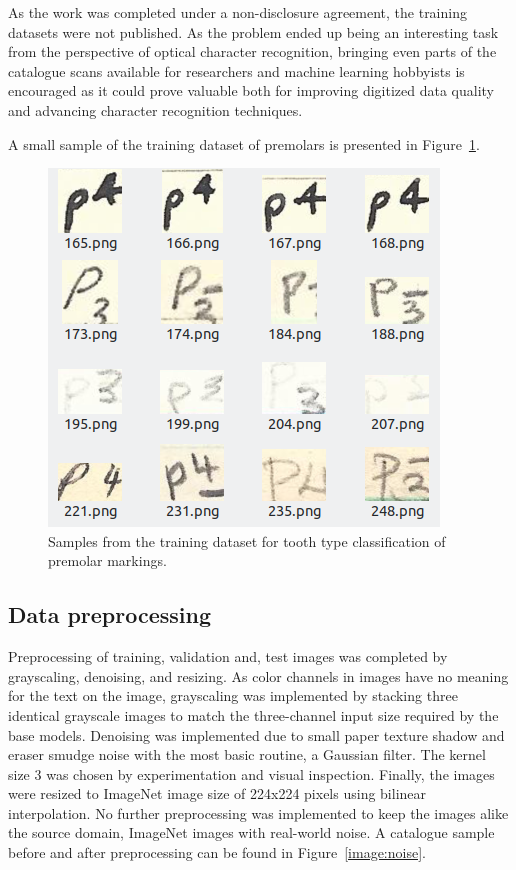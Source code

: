 \documentclass[english,twoside,openright]{UH_DS_MSc}
\begin{document}
As the work was completed under a non-disclosure agreement, the training datasets were not 
published. As the problem ended up being an interesting task from the perspective of optical character recognition, 
bringing even parts of the catalogue scans available for researchers and machine learning hobbyists is encouraged as it could prove
 valuable both for improving digitized data quality and advancing character recognition techniques.
 
A small sample of the training dataset of premolars is presented in Figure~\ref{image:samples}.

\begin{figure}[ht]
    \centering
    \includegraphics*[scale=.5]{images/trainingsamples.png}
    \caption{Samples from the training dataset for tooth type classification of premolar markings.}
    \label{image:samples}
\end{figure}

\subsection{Data preprocessing}
 
Preprocessing of training, validation and, test images was completed by grayscaling, denoising, and resizing.
As color channels in images have no meaning for the text on the image, grayscaling was implemented by
 stacking three identical grayscale images
to match the three-channel input size required by the base models.
Denoising was implemented due to
small paper texture shadow and eraser smudge noise with the most basic routine, a Gaussian filter.
The kernel size 3 was chosen by experimentation and visual inspection. Finally, the images were resized to 
ImageNet image size of 224x224 pixels using bilinear interpolation.
No further preprocessing was implemented to keep the images alike the source domain, ImageNet images with real-world noise.
 A catalogue sample before and after preprocessing can 
be found in Figure~\ref{image:noise}.
\end{document}
